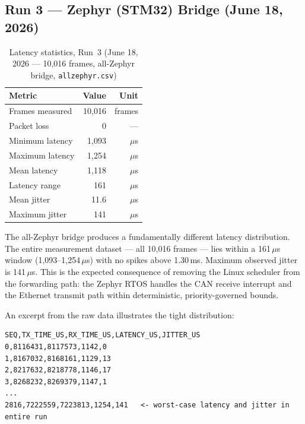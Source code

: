 \documentclass[11pt,a4paper]{article}
\begin{document}
\subsection{Run 3 --- Zephyr (STM32) Bridge (June 18, 2026)}
\label{sec:run3}

\begin{table}[H]
    \centering
    \caption{Latency statistics, Run~3 (June 18, 2026 --- 10{,}016 frames, all-Zephyr bridge,
             \texttt{allzephyr.csv})}
    \label{tab:run3}
    \begin{tabular}{lrr}
        \toprule
        \textbf{Metric} & \textbf{Value} & \textbf{Unit} \\
        \midrule
        Frames measured   & 10{,}016 & frames \\
        Packet loss       & 0        & --- \\
        \midrule
        Minimum latency   & 1{,}093  & $\mu$s \\
        Maximum latency   & 1{,}254  & $\mu$s \\
        Mean latency      & 1{,}118  & $\mu$s \\
        Latency range     & 161      & $\mu$s \\
        \midrule
        Mean jitter       & 11.6     & $\mu$s \\
        Maximum jitter    & 141      & $\mu$s \\
        \bottomrule
    \end{tabular}
\end{table}

The all-Zephyr bridge produces a fundamentally different latency distribution.
The entire measurement dataset --- all 10{,}016 frames --- lies within a 161\,$\mu$s window
(1{,}093--1{,}254\,$\mu$s) with no spikes above 1.30\,ms.  Maximum observed jitter is
141\,$\mu$s.  This is the expected consequence of removing the Linux scheduler from the
forwarding path: the Zephyr RTOS handles the CAN receive interrupt and the Ethernet transmit
path within deterministic, priority-governed bounds.

An excerpt from the raw data illustrates the tight distribution:

\begin{lstlisting}[caption={Selected rows from Run~3 raw CSV (allzephyr.csv, columns: SEQ,TX\_TIME\_US,RX\_TIME\_US,LATENCY\_US,JITTER\_US)}]
SEQ,TX_TIME_US,RX_TIME_US,LATENCY_US,JITTER_US
0,8116431,8117573,1142,0
1,8167032,8168161,1129,13
2,8217632,8218778,1146,17
3,8268232,8269379,1147,1
...
2816,7222559,7223813,1254,141   <- worst-case latency and jitter in entire run
\end{lstlisting}
\end{document}
